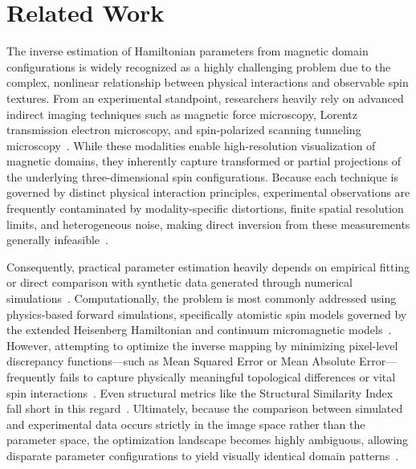 \documentclass[final,5p,times,twocolumn]{elsarticle}
\begin{document}
\section{Related Work}\label{sec:related}

The inverse estimation of Hamiltonian parameters from magnetic domain configurations is widely recognized as a highly challenging problem due to the complex, nonlinear relationship between physical interactions and observable spin textures. From an experimental standpoint, researchers heavily rely on advanced indirect imaging techniques such as magnetic force microscopy, Lorentz transmission electron microscopy, and spin-polarized scanning tunneling microscopy~\cite{nguyen2022cooperative}. While these modalities enable high-resolution visualization of magnetic domains, they inherently capture transformed or partial projections of the underlying three-dimensional spin configurations. Because each technique is governed by distinct physical interaction principles, experimental observations are frequently contaminated by modality-specific distortions, finite spatial resolution limits, and heterogeneous noise, making direct inversion from these measurements generally infeasible~\cite{zhao2025overview, gaida2023lorentz}. 

Consequently, practical parameter estimation heavily depends on empirical fitting or direct comparison with synthetic data generated through numerical simulations~\cite{zeng2022direct, altaf2024applications}. Computationally, the problem is most commonly addressed using physics-based forward simulations, specifically atomistic spin models governed by the extended Heisenberg Hamiltonian and continuum micromagnetic models~\cite{d2023micromagnetic, lepadatu2021micromagnetic, silva2024three}. However, attempting to optimize the inverse mapping by minimizing pixel-level discrepancy functions—such as Mean Squared Error or Mean Absolute Error—frequently fails to capture physically meaningful topological differences or vital spin interactions~\cite{mongwe2021adaptive, talapatra2022understanding}. Even structural metrics like the Structural Similarity Index fall short in this regard~\cite{karnatov2025analysis}. Ultimately, because the comparison between simulated and experimental data occurs strictly in the image space rather than the parameter space, the optimization landscape becomes highly ambiguous, allowing disparate parameter configurations to yield visually identical domain patterns~\cite{yin2023computational}.
\end{document}

